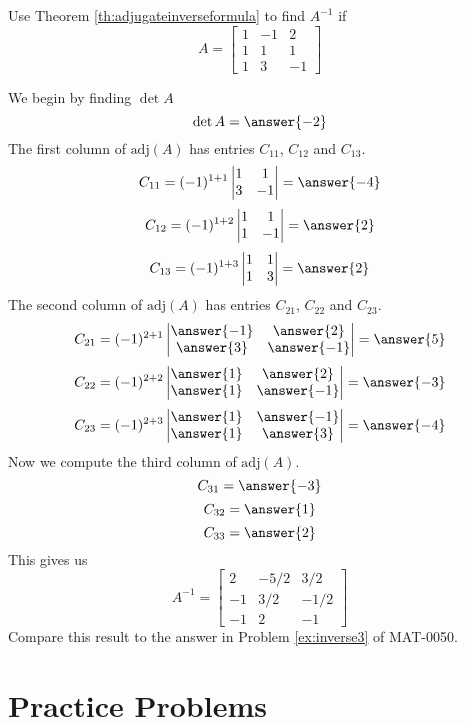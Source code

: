 \documentclass{ximera}
\begin{document}
\begin{example}\label{ex:inversebyadjugate}
Use Theorem \ref{th:adjugateinverseformula} to  find $A^{-1}$ if 
$$A=\begin{bmatrix}1&-1&2\\1&1&1\\1&3&-1\end{bmatrix}$$
\begin{explanation}
We begin by finding $\det{A}$
$$\det{A}=\answer{-2}$$
The first column of $\mbox{adj}(A)$ has entries $C_{11}$, $C_{12}$ and $C_{13}$.
$$C_{11}=(-1)^{1+1}\begin{vmatrix}1&1\\3&-1\end{vmatrix}=\answer{-4}$$
$$C_{12}=(-1)^{1+2}\begin{vmatrix}1&1\\1&-1\end{vmatrix}=\answer{2}$$
$$C_{13}=(-1)^{1+3}\begin{vmatrix}1&1\\1&3\end{vmatrix}=\answer{2}$$
The second column of $\mbox{adj}(A)$ has entries $C_{21}$, $C_{22}$ and $C_{23}$.
$$C_{21}=(-1)^{2+1}\begin{vmatrix}\answer{-1}&\answer{2}\\\answer{3}&\answer{-1}\end{vmatrix}=\answer{5}$$
$$C_{22}=(-1)^{2+2}\begin{vmatrix}\answer{1}&\answer{2}\\\answer{1}&\answer{-1}\end{vmatrix}=\answer{-3}$$
$$C_{23}=(-1)^{2+3}\begin{vmatrix}\answer{1}&\answer{-1}\\\answer{1}&\answer{3}\end{vmatrix}=\answer{-4}$$
Now we compute the third column of $\mbox{adj}(A)$.
$$C_{31}=\answer{-3}$$
$$C_{32}=\answer{1}$$
$$C_{33}=\answer{2}$$
This gives us
$$A^{-1}=\begin{bmatrix}2&-5/2&3/2\\-1&3/2&-1/2\\-1&2&-1\end{bmatrix}$$
Compare this result to the answer in Problem \ref{ex:inverse3} of MAT-0050.

\end{explanation}
\end{example}

\section*{Practice Problems}
\end{document}
